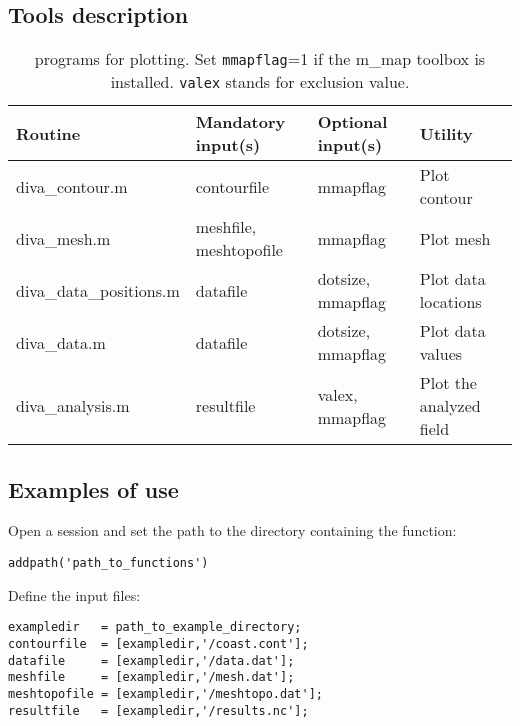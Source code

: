\subsection{Tools description}
 
\begin{table}[htpb]
\centering
\caption[\matlab programs for plotting.]{\matlab programs for plotting. Set \texttt{mmapflag}=1 if the m\_map toolbox is installed. \texttt{valex} stands for exclusion value.}
\begin{tabular*}{\textwidth}{@{\extracolsep{\fill}}llll}
\toprule
Routine				&	Mandatory input(s) 		&	Optional input(s)	& 	Utility  			\\
\midrule
diva\_contour.m 		&	contourfile 			& mmapflag 			&	Plot contour		\\
diva\_mesh.m 			& meshfile, meshtopofile 	& mmapflag 			&	Plot mesh			\\
diva\_data\_positions.m	& datafile 					& dotsize, mmapflag & 	Plot data locations	\\
diva\_data.m 			& datafile 					& dotsize, mmapflag & Plot data values		\\
diva\_analysis.m 		& resultfile 				& valex, mmapflag 	 & Plot the analyzed field \\
\bottomrule
\end{tabular*}
\end{table}

\subsection{Examples of use}

Open a \matlab session and set the path to the directory containing the function:

\begin{lstlisting}[style=Matlab]
addpath('path_to_functions')
\end{lstlisting}

Define the input files:

\begin{lstlisting}[style=Matlab]
exampledir   = path_to_example_directory;
contourfile  = [exampledir,'/coast.cont'];
datafile     = [exampledir,'/data.dat'];
meshfile     = [exampledir,'/mesh.dat'];
meshtopofile = [exampledir,'/meshtopo.dat'];
resultfile   = [exampledir,'/results.nc'];
\end{lstlisting}


